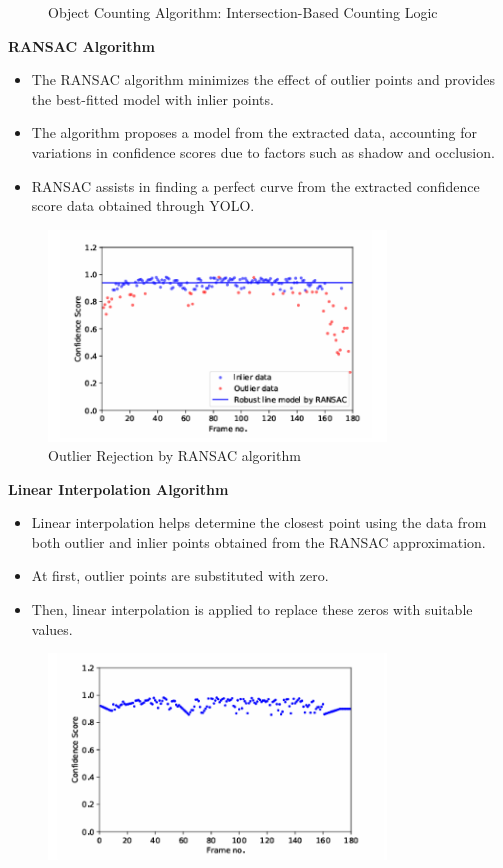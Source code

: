 {\begin{enumerate}
\begin{figure}[h!]
    \caption{Object Counting Algorithm: Intersection-Based Counting Logic}
\end{figure}
%
%
\end{enumerate}
%
%
\textbf{RANSAC Algorithm}
\begin{itemize}
    \item The RANSAC algorithm minimizes the effect of outlier points and provides the best-fitted model with inlier points.
    \item The algorithm proposes a model from the extracted data, accounting for variations in confidence scores due to factors such as shadow and occlusion.
    \item RANSAC assists in finding a perfect curve from the extracted confidence score data obtained through YOLO.
\end{itemize}
%
%
\begin{figure}[h!]
    \centering
    \includegraphics[width=0.8\textwidth]{images/RANSAC Outlier Rejection.png}
    \caption{Outlier Rejection by RANSAC algorithm}
\end{figure}
%
%
\textbf{Linear Interpolation Algorithm}
\begin{itemize}
    \item Linear interpolation helps determine the closest point using the data from both outlier and inlier points obtained from the RANSAC approximation.
    \item At first, outlier points are substituted with zero.
    \item Then, linear interpolation is applied to replace these zeros with suitable values.
\end{itemize}
%
%
\begin{figure}[h!]
    \centering
    \includegraphics[width=0.8\textwidth]{images/Linear Interpolation.png}

\end{figure}}
